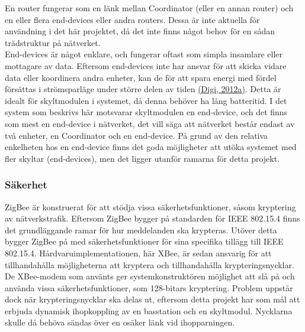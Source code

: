 \documentclass[a4paper,11pt]{article}
\begin{document}
En router fungerar som en länk mellan Coordinator (eller en annan router) och en eller flera end-devices eller andra routers. Dessa är inte aktuella för användning i det här projektet, då det inte finns något behov för en sådan trädstruktur på nätverket. \\

End-devices är något enklare, och fungerar oftast som simpla insamlare eller mottagare av data. Eftersom end-devices inte har ansvar för att skicka vidare data eller koordinera andra enheter, kan de för att spara energi med fördel försättas i strömsparläge under större delen av tiden \hyperref[digi]{(Digi, 2012a)}. Detta är idealt för skyltmodulen i systemet, då denna behöver ha lång batteritid. I det system som beskrivs här motsvarar skyltmodulen en end-device, och det finns som mest en end-device i nätverket, det vill säga att nätverket består endast av två enheter, en Coordinator och en end-device. På grund av den relativa enkelheten hos en end-device finns det goda möjligheter att utöka systemet med fler skyltar (end-devices), men det ligger utanför ramarna för detta projekt.

\subsubsection{Säkerhet}
ZigBee är konstruerat för att stödja vissa säkerhetsfunktioner, såsom kryptering av nätverkstrafik. Eftersom ZigBee bygger på standarden för IEEE 802.15.4 finns det grundläggande ramar för hur meddelanden ska krypteras. Utöver detta bygger ZigBee på med säkerhetsfunktioner för sina specifika tillägg till IEEE 802.15.4. Hårdvaruimplementationen, här XBee, är sedan ansvarig för att tillhandahålla möjligheterna att kryptera och tillhandahålla krypteringsnycklar. De XBee-modem som använts ger systemkonstruktören möjlighet att slå på och använda vissa säkerhetsfunktioner, som 128-bitars kryptering. Problem uppstår dock när krypteringsnycklar ska delas ut, eftersom detta projekt har som mål att erbjuda dynamisk ihopkoppling av en basstation och en skyltmodul. Nycklarna skulle då behöva sändas över en osäker länk vid ihopparningen. \\
\end{document}
